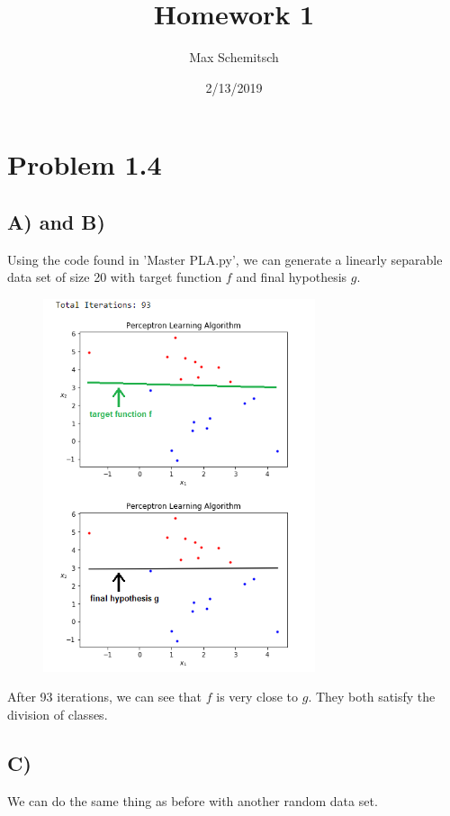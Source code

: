 \documentclass[a4paper]{article}
\title{Homework 1}
\author{Max Schemitsch}
\date{2/13/2019}
\begin{document}
\lstset{language=Python}

\maketitle

\section{Problem 1.4}

\subsection{A) and B)}
Using the code found in 'Master PLA.py', we can generate a linearly separable data set of size 20 with target function $f$ and final hypothesis $g$.

\begin{figure}[h]
  \begin{center}
    \includegraphics[width=80mm,scale=0.8]{problem14AB.png}
  \end{center}
\end{figure}

After 93 iterations, we can see that $f$ is very close to $g$. They both satisfy the division of classes.

\newpage

\subsection{C)}
We can do the same thing as before with another random data set.
\end{document}
